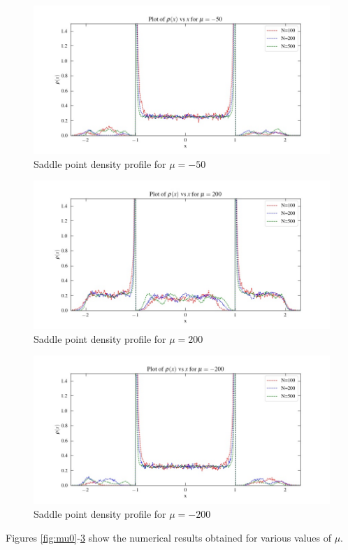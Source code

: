 \documentclass[11pt]{article}
\begin{document}
\begin{figure}[H]
	\centering
	\includegraphics[width=0.8\columnwidth]{m-50.jpg}
	\caption{Saddle point density profile for $\mu=-50$}
	\label{fig:mu-50}
\end{figure}
\begin{figure}[H]
	\centering
	\includegraphics[width=0.8\columnwidth]{m200.jpg}
	\caption{Saddle point density profile for $\mu=200$}
	\label{fig:mu200}
\end{figure}
\begin{figure}[H]
	\centering
	\includegraphics[width=0.8\columnwidth]{m-200.jpg}
	\caption{Saddle point density profile for $\mu=-200$}
	\label{fig:mu-200}
\end{figure}
Figures \ref{fig:mu0}-\ref{fig:mu-200} show the numerical results obtained for various values of $\mu$. 
\end{document}
